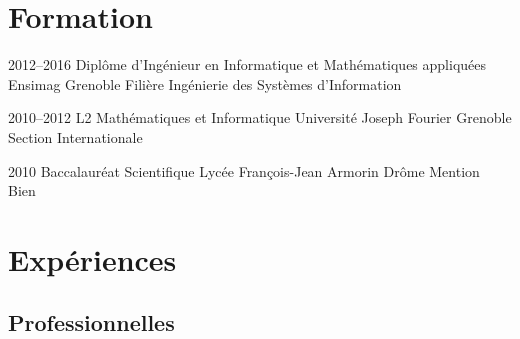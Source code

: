 \documentclass[11pt,a4paper,sans]{moderncv} %
\title{}
\begin{document}
\makecvtitle %
\vspace*{-1cm}

\section{Formation}
\cventry
    {2012--2016}
    {Diplôme d'Ingénieur en Informatique et Mathématiques appliquées}
    {}
    {Ensimag}
    {Grenoble}
    {Filière Ingénierie des Systèmes d'Information}
    
\cventry
    {2010--2012}
    {L2 Mathématiques et Informatique}
    {}
    {Université Joseph Fourier}
    {Grenoble}
    {Section Internationale}
    
\cventry
    {2010}
    {Baccalauréat Scientifique}
    {}
    {Lycée François-Jean Armorin}
    {Drôme}
    {Mention Bien}


\section{Expériences}

\subsection{Professionnelles}
\end{document}

